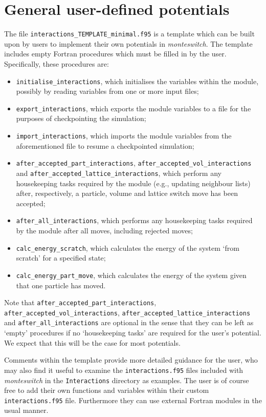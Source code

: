 \documentclass{report}
\begin{document}
\section{General user-defined potentials}
The file \texttt{interactions\_TEMPLATE\_minimal.f95} is a template which can be built upon by users to implement their own potentials
in \emph{monteswitch}. The template includes empty Fortran procedures which must be filled in by the user. Specifically, these
procedures are:
\begin{itemize}
\item
\texttt{initialise\_interactions}, which initialises the variables within the module, possibly 
by reading variables from one or more input files; 
\item
\texttt{export\_interactions}, which exports the module variables to a file for the purposes
of checkpointing the simulation; 
\item
\texttt{import\_interactions}, which imports the module variables from the aforementioned file to resume a checkpointed
simulation; 
\item
\texttt{after\_accepted\_part\_interactions}, \texttt{after\_accepted\_vol\_interactions} and 
\texttt{after\_accepted\_lattice\_interactions}, which perform any housekeeping tasks required by the module (e.g., updating neighbour lists)
after, respectively, a particle, volume and lattice switch move has been accepted; 
\item
\texttt{after\_all\_interactions}, which performs any housekeeping tasks required by the module after all moves, including
rejected moves; 
\item
\texttt{calc\_energy\_scratch}, which calculates the energy of the system `from scratch' for a specified state;
\item
\texttt{calc\_energy\_part\_move}, which calculates the energy of the system given that one particle has moved.
\end{itemize}
Note that \texttt{after\_accepted\_part\_interactions}, \texttt{after\_accepted\_vol\_interactions}, \texttt{after\_accepted\_lattice\_interactions}
and \texttt{after\_all\_interactions} are optional in the sense that they can be left as `empty' procedures if no `housekeeping tasks' are required 
for the user's potential. We expect that this will be the case for most potentials.

Comments within the template provide more detailed guidance for the user, who may also find it useful to examine the \texttt{interactions.f95} files 
included with \emph{monteswitch} in the \texttt{Interactions} directory as examples. The user is of course free to add their own 
functions and variables within their custom \texttt{interactions.f95} file. Furthermore they can use external Fortran modules in the usual manner. 
\end{document}
